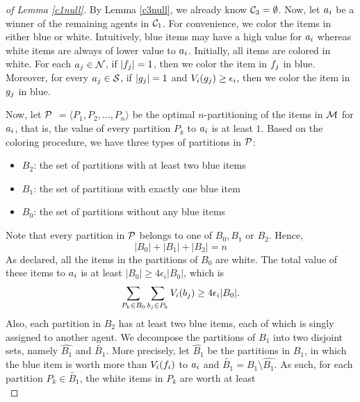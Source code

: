 
\begin{proof}[of Lemma \ref{c1null}]
By Lemma \ref{c3null}, we already know $\mathcal{C}_3 = \emptyset$. Now, let $a_i$ be a winner of the remaining agents in $\mathcal{C}_1$. For convenience, we color the items in either blue or white. Intuitively, blue items may have a high value for $a_i$ whereas white items are always of lower value to $a_i$. Initially, all items are colored in white. For each $a_j  \in \mathcal{N}$, if $|f_j|=1$, then we color the item in $f_j$ in blue. Moreover, for every $a_j \in \mathcal{S}$, if $|g_j|=1$ and $V_i(g_j) \geq \epsilon_i$, then we color the item in $g_j$ in blue. 


Now, let $\cal P$ $= \langle P_1, P_2, \ldots, P_n \rangle$ be the optimal $n$-partitioning of the items in $\mathcal{M}$ for $a_i$, that is, the value of every partition $P_k$ to $a_i$ is at least $1$. Based on the coloring procedure, we have three types of partitions in $\cal P$:
\begin{itemize}
    \item $B_2$: the set of partitions with at least two blue items
    \item $B_1$: the set of partitions with exactly one blue item
    \item $B_0$: the set of partitions without any blue items
\end{itemize}
Note that every partition in $\cal P$ belongs to one of $B_0,B_1$ or $B_2$. Hence,
\begin{equation}
\label{sumba}
|B_0| + |B_1| + |B_2| = n
\end{equation}
As declared, all the items in the partitions of $B_0$ are white. The total value of these items to $a_i$ is at least $|B_0| \geq 4 \epsilon_i |B_0|$, which is
\begin{equation}\label{pq1}
\sum_{P_k \in B_0}\sum_{b_j \in P_k} V_i(b_j) \geq 4 \epsilon_i |B_0|.
\end{equation}
 Also, each partition in $B_2$ has at least two blue items, each of which is singly assigned to another agent. We decompose the partitions of $B_1$ into two disjoint sets, namely $\hat{B_1}$ and $\tilde{B_1}$. More precisely, let $\hat{B_1}$ be the partitions in $B_1$, in which the blue item is worth more than $V_i(f_i)$ to $a_i$ and $\tilde{B_1} = B_1 \setminus \hat{B_1}$. As such, for each partition $P_k \in \tilde{B_1}$, 
the white items in $P_k$ are worth at least 
\begin{equation*}

\end{equation*}
\end{proof}
